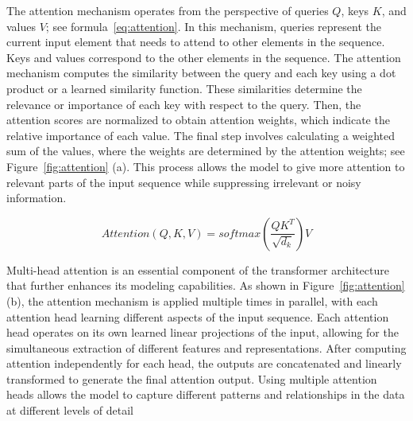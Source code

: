 The attention mechanism operates from the perspective of queries $Q$, keys $K$, and values $V$; see formula~\ref{eq:attention}. In this mechanism, queries represent the current input element that needs to attend to other elements in the sequence. Keys and values correspond to the other elements in the sequence. The attention mechanism computes the similarity between the query and each key using a dot product or a learned similarity function. These similarities determine the relevance or importance of each key with respect to the query. Then, the attention scores are normalized to obtain attention weights, which indicate the relative importance of each value. The final step involves calculating a weighted sum of the values, where the weights are determined by the attention weights; see Figure~\ref{fig:attention} (a). This process allows the model to give more attention to relevant parts of the input sequence while suppressing irrelevant or noisy information. 

\begin{equation}\label{eq:attention}
    Attention(Q, K, V) = softmax(\frac{QK^T} {\sqrt{d_k}})V 
\end{equation}


Multi-head attention is an essential component of the transformer architecture that further enhances its modeling capabilities. As shown in Figure~\ref{fig:attention} (b), the attention mechanism is applied multiple times in parallel, with each attention head learning different aspects of the input sequence. Each attention head operates on its own learned linear projections of the input, allowing for the simultaneous extraction of different features and representations. After computing attention independently for each head, the outputs are concatenated and linearly transformed to generate the final attention output. Using multiple attention heads allows the model to capture different patterns and relationships in the data at different levels of detail

